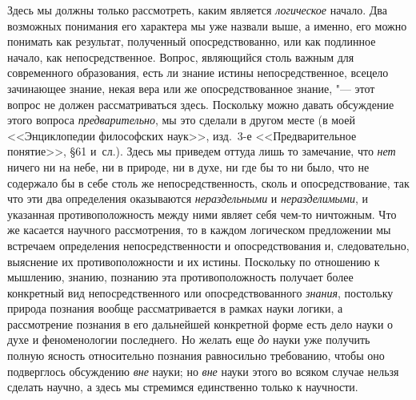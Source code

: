 Здесь мы должны только рассмотреть, каким является
{\em логическое} начало. Два возможных понимания его
характера мы уже назвали выше, а именно, его можно понимать как результат,
полученный опосредствованно, или как подлинное начало, как
непосредственное. Вопрос, являющийся столь важным для современного
образования, есть ли знание истины непосредственное, всецело зачинающее
знание, некая вера или же опосредствованное знание, "--- этот вопрос не должен
рассматриваться здесь. Поскольку можно давать обсуждение этого вопроса
{\em предварительно}, мы это сделали в другом месте (в
моей <<Энциклопедии философских наук>>, изд.~3-е <<Предварительное понятие>>,
§61 и~сл.). Здесь мы приведем оттуда лишь то замечание, что
{\em нет} ничего ни на небе, ни в природе, ни в духе,
ни где бы то ни было, что не содержало бы в себе столь же
непосредственность, сколь и опосредствование, так что эти два определения
оказываются {\em нераздельными} и
{\em неразделимыми}, и указанная противоположность
между ними являет себя чем-то ничтожным. Что же касается научного
рассмотрения, то в каждом логическом предложении мы встречаем определения
непосредственности и опосредствования и, следовательно, выяснение их
противоположности и их истины. Поскольку по отношению к мышлению, знанию,
познанию эта противоположность получает более конкретный вид
непосредственного или опосредствованного {\em знания},
постольку природа познания вообще рассматривается в рамках науки логики, а
рассмотрение познания в его дальнейшей конкретной форме есть дело науки о
духе и феноменологии последнего. Но желать еще {\em до}
науки уже получить полную ясность относительно познания равносильно
требованию, чтобы оно подверглось обсуждению {\em вне}
науки; но {\em вне} науки этого во всяком случае нельзя
сделать научно, а здесь мы стремимся единственно только к научности.

